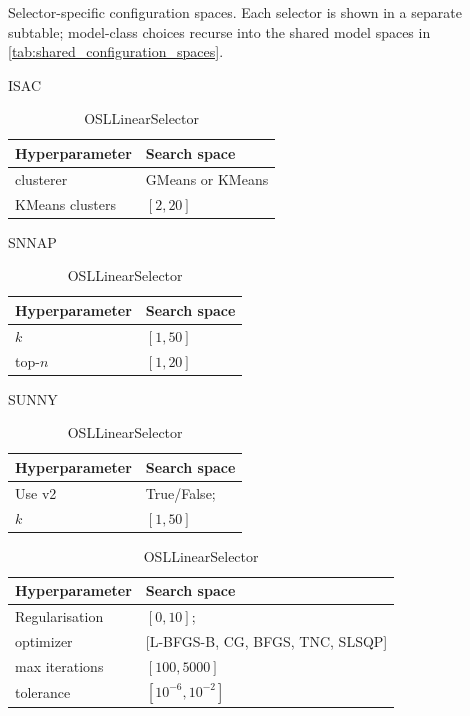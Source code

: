 \begin{table}[!htbp]
  \centering
  \caption[Selector-specific configuration spaces]{Selector-specific configuration spaces. Each selector is shown in a separate subtable; model-class choices recurse into the shared model spaces in \autoref{tab:shared_configuration_spaces}.}
  \label{tab:selector_configuration_spaces}
  \begin{subtable}[t]{0.48\textwidth}
    \centering
    \caption{ISAC}
    \begin{tabular}{ll}
      \toprule
      Hyperparameter & Search space \\
      \midrule
      clusterer & GMeans or KMeans \\
      KMeans clusters & $[2,20]$ \\
      \bottomrule
    \end{tabular}%
  \end{subtable}

  \begin{subtable}[t]{0.48\textwidth}
    \centering
    \caption{SNNAP}
    \begin{tabular}{ll}
      \toprule
      Hyperparameter & Search space \\
      \midrule
      $k$ & $[1,50]$ \\
      top-$n$ & $[1,20]$\\
      \bottomrule
    \end{tabular}%
  \end{subtable}
  \hfill
  \begin{subtable}[t]{0.48\textwidth}
    \centering
    \caption{SUNNY}
    \begin{tabular}{ll}
      \toprule
      Hyperparameter & Search space \\
      \midrule
      Use v2 & True/False; \\
      $k$ & $[1,50]$ \\
      \bottomrule
    \end{tabular}%
  \end{subtable}
  \begin{subtable}[t]{0.48\textwidth}
    \centering
    \caption{OSLLinearSelector}
    \begin{tabular}{ll}
      \toprule
      Hyperparameter & Search space \\
      \midrule
      Regularisation & $[0,10]$;  \\
      optimizer & [L-BFGS-B, CG, BFGS, TNC, SLSQP] \\
      max iterations & $[100,5000]$\\
      tolerance & $[10^{-6},10^{-2}]$ \\
      \bottomrule
    \end{tabular}%
  \end{subtable}

\end{table}